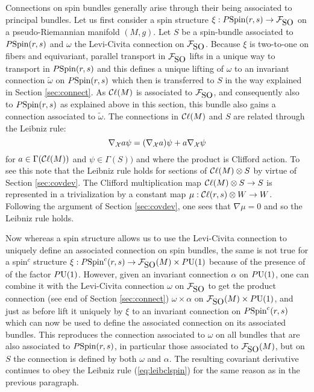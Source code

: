 \documentclass[12pt,titlepage]{article}
\def\cC{{\cal C}}
\def\cF{{\cal F}}
\def\cX{{\cal X}}
\def\Cl{{\cC\ell}}
\def\SO{\hbox{SO}}
\def\Spin{\hbox{Spin}}
\def\U{\hbox{U}}
\begin{document}
Connections on spin bundles generally arise through their being associated
to principal bundles. Let us first consider a spin structure
\linebreak
\(\xi:P\Spin(r,s)\to \cF_{\SO}\) on a pseudo-Riemannian manifold \((M,g)\). 
Let 
\(S\) be a
spin-bundle associated to \(P\Spin(r,s)\) and \(\omega\) the Levi-Civita
connection on \(\cF_{\SO}\). Because \(\xi\) is two-to-one on fibers and
equivariant, parallel transport in \(\cF_{\SO}\) lifts in a unique way to
transport in \(P\Spin(r,s)\) and this defines a unique lifting of
\(\omega\) to an invariant connection \(\tilde\omega\) on \(P\Spin(r,s)\)
which then is transferred to \(S\) in the way  explained in Section
\ref{sec:connect}.  As \(\Cl(M)\) is
associated to \(\cF_{\SO}\), and consequently also to  \(P\Spin(r,s)\) as
explained above in this section, this bundle also gains a connection
associated to \(\tilde\omega\). The connections in  \(\Cl(M)\) and \(S\)
are related through the Leibniz rule:
\begin{equation}\label{eq:leibclspin}%
\nabla_\cX a\psi=(\nabla_\cX a)\psi+a\nabla_\cX\psi
\end{equation}%
for \(a\in \Gamma(\Cl(M))\) and \(\psi\in\Gamma(S))\) and where the product
is Clifford action. To see this note that the Leibniz rule holds
for sections of  \(\Cl(M)\otimes S\) by virtue of Section \ref{sec:covdev}.
 The Clifford multiplication map \(
\Cl(M)\otimes S \to S\) is represented in a  trivialization by a
constant map \(\mu:\Cl(r,s)\otimes W \to W\). Following the argument of
Section  \ref{sec:covdev},  one sees
that \(\nabla \mu=0\) and so the Leibniz rule holds.

Now whereas a spin structure allows us to use the Levi-Civita connection to 
uniquely define an associated connection on spin bundles, the same is not 
true for a spin\({}^c\) structure \(\xi:P\Spin^c(r,s)\to \cF_{\SO}(M)\times 
P\U(1)\)
because of the presence of of the factor \(P\U(1)\).  However, given an 
invariant connection \(\alpha\) on \(P\U(1)\), one can combine it with the 
Levi-Civita connection \(\omega\) on \(\cF_{\SO}\) to get the 
product connection (see end of Section \ref{sec:connect})
\(\omega \times \alpha\) on \(\cF_{\SO}(M)\times P\U(1)\), and just 
as before lift 
it uniquely by \(\xi\) to an invariant connection on 
\(P\Spin^c(r,s)\) which 
can now be used to define the associated connection on its associated 
bundles. This reproduces the connection associated to \(\omega\) on all 
bundles that are also associated to \(P\Spin(r,s)\), in particular those 
associated to \(\cF_{\SO}(M)\), but on \(S\) the connection 
is defined by both 
\(\omega\) and \(\alpha\). The resulting covariant derivative continues to 
obey the Leibniz rule (\ref{eq:leibclspin}) for the same reason as 
in the previous paragraph. 
\end{document}
